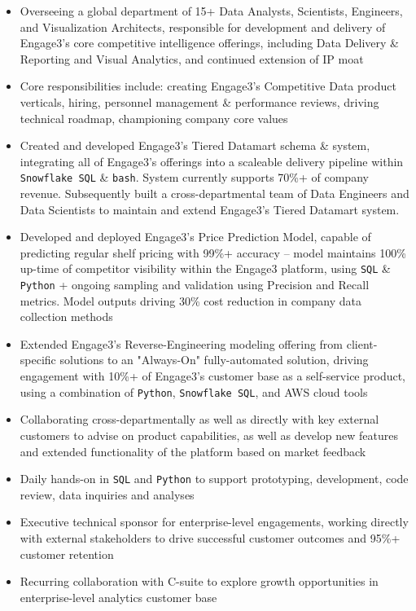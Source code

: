 \documentclass[]{deedy-resume-openfont}
\begin{document}
\begin{itemize} %
\item Overseeing a global department of 15+ Data Analysts, Scientists, Engineers, and Visualization Architects, responsible for development and delivery of Engage3's core competitive intelligence offerings, including Data Delivery \& Reporting and Visual Analytics, and continued extension of IP moat
\item Core responsibilities include: creating Engage3's Competitive Data product verticals, hiring, personnel management \& performance reviews, driving technical roadmap, championing company core values
\item Created and developed Engage3's Tiered Datamart schema \& system, integrating all of Engage3's offerings into a scaleable delivery pipeline within \verb|Snowflake SQL| \& \verb|bash|.  System currently supports 70\%+ of company revenue.  Subsequently built a cross-departmental team of Data Engineers and Data Scientists to maintain and extend Engage3's Tiered Datamart system.
\item Developed and deployed Engage3's Price Prediction Model, capable of predicting regular shelf pricing with 99\%+ accuracy -- model maintains 100\% up-time of competitor visibility within the Engage3 platform, using \verb|SQL| \& \verb|Python| + ongoing sampling and validation using Precision and Recall metrics.  Model outputs driving 30\% cost reduction in company data collection methods
\item Extended Engage3's Reverse-Engineering modeling offering from client-specific solutions to an "Always-On" fully-automated solution, driving engagement with 10\%+ of Engage3's customer base as a self-service product, using a combination of \verb|Python|, \verb|Snowflake SQL|, and AWS cloud tools
\item Collaborating cross-departmentally as well as directly with key external customers to advise on product capabilities, as well as develop new features and extended functionality of the platform based on market feedback
\item Daily hands-on in \verb|SQL| and \verb|Python| to support prototyping, development, code review, data inquiries and analyses
\item Executive technical sponsor for enterprise-level engagements, working directly with external stakeholders to drive successful customer outcomes and 95\%+ customer retention
\item Recurring collaboration with C-suite to explore growth opportunities in enterprise-level analytics customer base
\end{itemize} %
\end{document}
